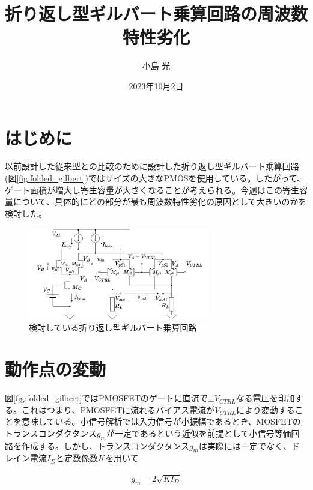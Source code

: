 \documentclass[twocolumn]{jsarticle}
\begin{document}
\title{折り返し型ギルバート乗算回路の周波数特性劣化}
\author{小島 光}
\date{2023年10月2日}
\maketitle

\section{はじめに}
以前設計した従来型との比較のために設計した折り返し型ギルバート乗算回路(図\eqref{fig:folded_gilbert})ではサイズの大きなPMOSを使用している。したがって、ゲート面積が増大し寄生容量が大きくなることが考えられる。今週はこの寄生容量について、具体的にどの部分が最も周波数特性劣化の原因として大きいのかを検討した。

\begin{figure}[b]
    \begin{center}
        \includegraphics*[width=80mm]{figures/folded_gilbert.png}
        \caption{検討している折り返し型ギルバート乗算回路}
        \label{fig:folded_gilbert}
    \end{center}
\end{figure}

\section{動作点の変動}
図\eqref{fig:folded_gilbert}ではPMOSFETのゲートに直流で$\pm V_{CTRL}$なる電圧を印加する。これはつまり、PMOSFETに流れるバイアス電流が$V_{CTRL}$により変動することを意味している。小信号解析では入力信号が小振幅であるとき、MOSFETのトランスコンダクタンス$g_{m}$が一定であるという近似を前提として小信号等価回路を作成する。しかし、トランスコンダクタンス$g_{m}$は実際には一定でなく、ドレイン電流$I_{D}$と定数係数$K$を用いて

\begin{align}
    g_{m}=2\sqrt{KI_{D}} \label{eq:gm}
\end{align}
\end{document}
